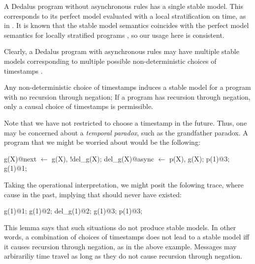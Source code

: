 A Dedalus program without asynchronous rules has a single stable model.  This corresponds to its perfect model evaluated with a local stratification on time, as in .  It is known that the stable model semantics coincides with the perfect model semantics for locally stratified programs , so our usage here is consistent.

Clearly, a Dedalus program with asynchronous rules may have multiple stable models corresponding to multiple possible non-deterministic choices of timestamps .


\begin{lemma}
Any non-deterministic choice of timestamps induces a stable model for a \lang program with no recursion through negation; If a \lang program has recursion through negation, only a causal choice of timestamps is permissible.
\end{lemma}

Note that we have not restricted  to choose a timestamp in the future.  Thus, one may be concerned about a {\em temporal paradox}, such as the grandfather paradox.  A program that we might be worried about would be the following:

\begin{Dedalus}
g(X)@next \(\leftarrow\) g(X), !del_g(X);
del_g(X)@async \(\leftarrow\) p(X), g(X);
p(1)@3;
g(1)@1;
\end{Dedalus}

Taking the operational interpretation, we might posit the folowing trace, where  cause  in the past, implying that  should never have existed:

\begin{Dedalus}
g(1)@1;
g(1)@2;
del_g(1)@2;
g(1)@3;
p(1)@3;
\end{Dedalus}

This lemma says that such situations do not produce stable models.  In other words, a combination of choices of timestamps does not lead to a stable model iff it causes recursion through negation, as in the above example.  Messages may arbirariliy time travel as long as they do not cause recursion through negation.

